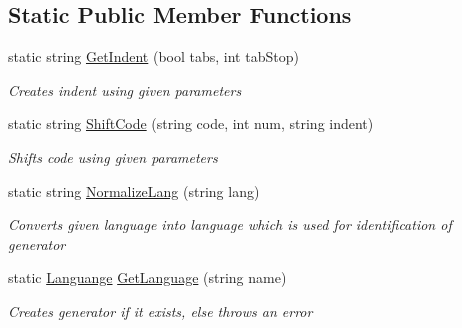 \subsection*{Static Public Member Functions}
\begin{DoxyCompactItemize}
\item 
static string \mbox{\hyperlink{classCodeGen_1_1generators_1_1GeneratorConf_a00082fad632c4dda77b1b025d1b2b280}{Get\+Indent}} (bool tabs, int tab\+Stop)
\begin{DoxyCompactList}\small\item\em Creates indent using given parameters \end{DoxyCompactList}\item 
static string \mbox{\hyperlink{classCodeGen_1_1generators_1_1GeneratorConf_a71dbec00a6e5d6d390dd8a24b64b6bb2}{Shift\+Code}} (string code, int num, string indent)
\begin{DoxyCompactList}\small\item\em Shifts code using given parameters \end{DoxyCompactList}\item 
static string \mbox{\hyperlink{classCodeGen_1_1generators_1_1GeneratorConf_a7b70aa3e67ba52dfbd1a271da20fc74e}{Normalize\+Lang}} (string lang)
\begin{DoxyCompactList}\small\item\em Converts given language into language which is used for identification of generator \end{DoxyCompactList}\item 
static \mbox{\hyperlink{structCodeGen_1_1generators_1_1Languange}{Languange}} \mbox{\hyperlink{classCodeGen_1_1generators_1_1GeneratorConf_a358bcc4be771d981ac1aa4c451b48383}{Get\+Language}} (string name)
\begin{DoxyCompactList}\small\item\em Creates generator if it exists, else throws an error \end{DoxyCompactList}\end{DoxyCompactItemize}

